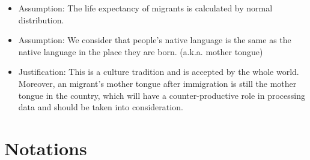 \documentclass{mcmthesis}
\begin{document}
\begin{itemize}
\item Assumption: The life expectancy of migrants is calculated by normal distribution.
\item Assumption: We consider that people's native language is the same as the native language in the place they are born. (a.k.a. mother tongue)
\item Justification: This is a culture tradition and is accepted by the whole world. Moreover, an migrant's mother tongue after immigration is still the mother tongue in the country, which will have a counter-productive role in processing data and should be taken into consideration.
\end{itemize}

\section{Notations}
\end{document}
